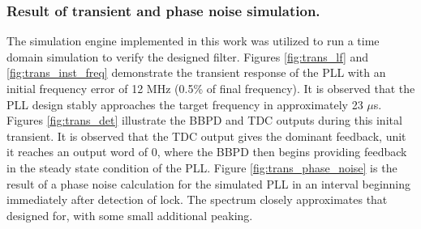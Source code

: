 \subsubsection{Result of transient and phase noise simulation.}
The simulation engine implemented in this work was utilized to run a time domain simulation to verify the designed filter. Figures \ref{fig:trans_lf} and \ref{fig:trans_inst_freq} demonstrate the transient response of the PLL with an initial frequency error of 12 MHz (0.5\% of final frequency). It is observed that the PLL design stably approaches the target frequency in approximately 23 $\mu$s. Figures \ref{fig:trans_det} illustrate the BBPD and TDC outputs during this inital transient. It is observed that the TDC output gives the dominant feedback, unit it reaches an output word of 0, where the BBPD then begins providing feedback in the steady state condition of the PLL. Figure \ref{fig:trans_phase_noise} is the result of a phase noise calculation for the simulated PLL in an interval beginning immediately after detection of lock. The spectrum closely approximates that designed for, with some small additional peaking.
